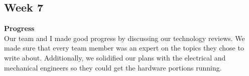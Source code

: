 \documentclass[onecolumn, oneside, letterpaper, draftclsnofoot, 10pt, compsoc]{IEEEtran}
\begin{document}

\subsection{Week 7}
\noindent \textbf{Progress}\\
Our team and I made good progress by discussing our technology reviews. We made sure that every team member was an expert on the topics they chose to write about. Additionally, we solidified our plans with the electrical and mechanical engineers so they could get the hardware portions running.
\end{document}
